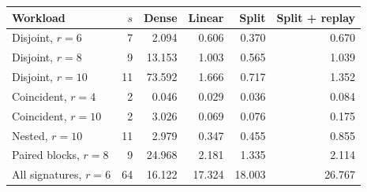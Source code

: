 \begin{tabular}{@{}lrrrrr@{}}
\toprule
Workload & $s$ & Dense & Linear & Split & Split + replay\\
\midrule
Disjoint, $r=6$ & 7 & 2.094 & 0.606 & 0.370 & 0.670\\
Disjoint, $r=8$ & 9 & 13.153 & 1.003 & 0.565 & 1.039\\
Disjoint, $r=10$ & 11 & 73.592 & 1.666 & 0.717 & 1.352\\
Coincident, $r=4$ & 2 & 0.046 & 0.029 & 0.036 & 0.084\\
Coincident, $r=10$ & 2 & 3.026 & 0.069 & 0.076 & 0.175\\
Nested, $r=10$ & 11 & 2.979 & 0.347 & 0.455 & 0.855\\
Paired blocks, $r=8$ & 9 & 24.968 & 2.181 & 1.335 & 2.114\\
All signatures, $r=6$ & 64 & 16.122 & 17.324 & 18.003 & 26.767\\
\bottomrule
\end{tabular}
